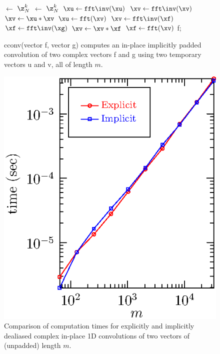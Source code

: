 \documentclass[final]{siamltex}
\begin{document}
\setlength{\algomargin}{0.8em}
\SetAlCapSkip{3pt}
\def\FFT{\tt fft}

\begin{figure}[htbp]
\begin{minipage}{.49\linewidth}
\begin{center}
\begin{function}[H]
  \xu $\leftarrow$ $\z_N^k$ \xf\;
  \xv $\leftarrow$ $\z_N^k$ \xg\;
  \medskip
  $\xu \leftarrow \FFT\inv(\xu)$\;
  $\xv \leftarrow \FFT\inv(\xv)$\;
  $\xv \leftarrow \xu * \xv$\;
  $\xu \leftarrow \FFT(\xv)$\;
  \medskip
  $\xv \leftarrow \FFT\inv(\xf)$\;
  $\xf \leftarrow \FFT\inv(\xg)$\;
  $\xv \leftarrow \xv * \xf$\;
  $\xf \leftarrow \FFT(\xv)$\;
  \Return f;
\caption{cconv(vector {\sf f}, vector {\sf g}) computes
an in-place implicitly padded convolution of two complex vectors {\sf f}
and {\sf g} using two temporary vectors {\sf u} and {\sf v}, all of length
$m$.}\label{cconv}
\end{function}
\end{center}
\end{minipage}
\begin{minipage}{0.49\linewidth}
\begin{center}
\includegraphics{timing1c}
\caption{Comparison of computation times for explicitly and implicitly
dealiased complex in-place 1D convolutions of two vectors of
(unpadded) length $m$.}
\label{timing1c}
\end{center}
\end{minipage}
\end{figure}
\end{document}
